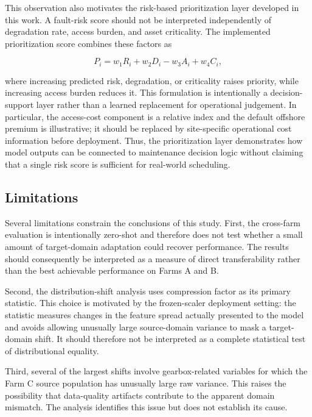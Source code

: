 \documentclass[conference]{IEEEtran}
\begin{document}
This observation also motivates the risk-based prioritization layer developed
in this work. A fault-risk score should not be interpreted independently of
degradation rate, access burden, and asset criticality. The implemented
prioritization score combines these factors as

\begin{equation}
P_i =
w_1 R_i +
w_2 D_i -
w_3 A_i +
w_4 C_i ,
\end{equation}

where increasing predicted risk, degradation, or criticality raises priority,
while increasing access burden reduces it. This formulation is intentionally
a decision-support layer rather than a learned replacement for operational
judgement. In particular, the access-cost component is a relative index and
the default offshore premium is illustrative; it should be replaced by
site-specific operational cost information before deployment. Thus, the
prioritization layer demonstrates how model outputs can be connected to
maintenance decision logic without claiming that a single risk score is
sufficient for real-world scheduling.

\subsection{Limitations}

Several limitations constrain the conclusions of this study. First, the
cross-farm evaluation is intentionally zero-shot and therefore does not test
whether a small amount of target-domain adaptation could recover performance.
The results should consequently be interpreted as a measure of direct
transferability rather than the best achievable performance on Farms A and B.

Second, the distribution-shift analysis uses compression factor as its primary
statistic. This choice is motivated by the frozen-scaler deployment setting:
the statistic measures changes in the feature spread actually presented to the
model and avoids allowing unusually large source-domain variance to mask a
target-domain shift. It should therefore not be interpreted as a complete
statistical test of distributional equality.

Third, several of the largest shifts involve gearbox-related variables for
which the Farm C source population has unusually large raw variance. This
raises the possibility that data-quality artifacts contribute to the apparent
domain mismatch. The analysis identifies this issue but does not establish its
cause.
\end{document}

